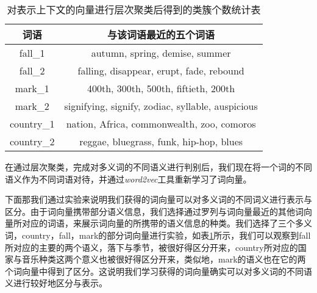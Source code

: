 \begin{longtable}{cc}
\caption[与多义词不同语义对应词向量距离最近的词语]{对表示上下文的向量进行层次聚类后得到的类簇个数统计表}
\label{tab:near4demo} \\
\toprule[1.5pt]
词语 & 与该词语最近的五个词语 \\
\midrule[1pt]
fall\_1	& autumn, spring, demise, summer\\
fall\_2 	& falling, disappear, erupt, fade, rebound\\
mark\_1	& 400th, 300th, 500th, fiftieth, 200th\\
mark\_2	& signifying, signify, zodiac, syllable, auspicious\\
country\_1	&	nation, Africa, commonwealth, zoo, comoros\\
country\_2	&	reggae, bluegrass, funk, hip-hop, blues\\
\endfirsthead
\end{longtable}

在通过层次聚类，完成对多义词的不同语义进行判别后，我们现在将一个词的不同语义作为不同词语对待，并通过\emph{word2vec}工具重新学习了词向量。

下面那我们通过实验来说明我们获得的词向量可以对多义词的不同词义进行表示与区分。由于词向量携带部分语义信息，我们选择通过罗列与词向量最近的其他词向量所对应的词语，来展示词向量的所携带的语义信息的种类。我们选择了三个多义词，country，fall，mark的部分词向量进行实验，如表\ref{tab:near4demo}所示，我们可以观察到fall所对应的主要的两个语义，落下与季节，被很好得区分开来，country所对应的国家与音乐种类这两个意义也被很好得区分开来，类似地，mark的语义也在它的两个词向量中得到了区分。这说明我们学习获得的词向量确实可以对多义词的不同语义进行较好地区分与表示。